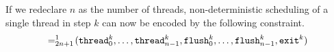If we redeclare $n$ as the number of threads, non-deterministic scheduling of a single thread in step $k$ can now be encoded by the following constraint.
\[
  =^1_{2n + 1}\!(\texttt{thread}^k_0, \ldots, \texttt{thread}^k_{n-1}, \texttt{flush}^k_0, \ldots, \texttt{flush}^k_{n-1}, \texttt{exit}^k)
\]

